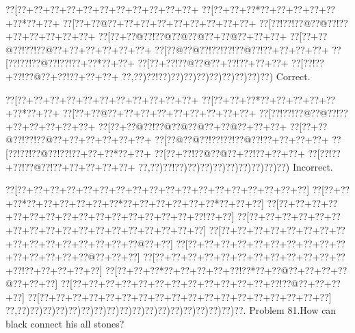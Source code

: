 \documentclass[a5paper]{article}
\begin{document}
\begin{center}
{\goo
\0??[\0??+\0??+\0??+\0??+\0??+\0??+\0??+\0??+\0??+\0??+\0??+
\0??[\0??+\0??+\0??*\0??+\0??+\0??+\0??+\0??+\0??*\0??+\0??+
\0??[\0??+\0??@\0??+\0??+\0??+\0??+\0??+\0??+\0??+\0??+\0??+
\0??[\0??!\0??!\0??@\0??@\0??!\0??+\0??+\0??+\0??+\0??+\0??+
\0??[\0??+\0??@\0??!\0??@\0??@\0??@\0??+\0??@\0??+\0??+\0??+
\0??[\0??+\0??@\0??!\0??!\0??@\0??+\0??+\0??+\0??+\0??+\0??+
\0??[\0??@\0??@\0??!\0??!\0??!\0??@\0??!\0??+\0??+\0??+\0??+
\0??[\0??!\0??!\0??@\0??!\0??!\0??+\0??*\0??+\0??+
\0??[\0??+\0??!\0??@\0??@\0??+\0??!\0??+\0??+\0??+
\0??[\0??!\0??+\0??!\0??@\0??+\0??!\0??+\0??+\0??+
\0??,\0??)\0??!\0??)\0??)\0??)\0??)\0??)\0??)\0??)\0??)\0??)
}
Correct. 

\end{center}
\begin{center}
{\goo
\0??[\0??+\0??+\0??+\0??+\0??+\0??+\0??+\0??+\0??+\0??+\0??+
\0??[\0??+\0??+\0??*\0??+\0??+\0??+\0??+\0??+\0??*\0??+\0??+
\0??[\0??+\0??@\0??+\0??+\0??+\0??+\0??+\0??+\0??+\0??+\0??+
\0??[\0??!\0??!\0??@\0??@\0??!\0??+\0??+\0??+\0??+\0??+\0??+
\0??[\0??+\0??@\0??!\0??@\0??@\0??@\0??+\0??@\0??+\0??+\0??+
\0??[\0??+\0??@\0??!\0??!\0??@\0??+\0??+\0??+\0??+\0??+\0??+
\0??[\0??@\0??@\0??!\0??!\0??!\0??@\0??!\0??+\0??+\0??+\0??+
\0??[\0??!\0??!\0??@\0??!\0??!\0??+\0??+\0??*\0??+\0??+
\0??[\0??+\0??!\0??@\0??@\0??+\0??!\0??+\0??+\0??+
\0??[\0??!\0??+\0??!\0??@\0??!\0??+\0??+\0??+\0??+\0??+
\0??,\0??)\0??!\0??)\0??)\0??)\0??)\0??)\0??)\0??)\0??)\0??)
}
Incorrect. 

\end{center}
\newpage
\begin{center}
{\goo
\0??[\0??+\0??+\0??+\0??+\0??+\0??+\0??+\0??+\0??+\0??+\0??+\0??+\0??+\0??+\0??+\0??+\0??+\0??]
\0??[\0??+\0??+\0??*\0??+\0??+\0??+\0??+\0??+\0??*\0??+\0??+\0??+\0??+\0??+\0??*\0??+\0??+\0??]
\0??[\0??+\0??+\0??+\0??+\0??+\0??+\0??+\0??+\0??+\0??+\0??+\0??+\0??+\0??+\0??+\0??!\0??+\0??]
\0??[\0??+\0??+\0??+\0??+\0??+\0??+\0??+\0??+\0??+\0??+\0??+\0??+\0??+\0??+\0??+\0??+\0??+\0??]
\0??[\0??+\0??+\0??+\0??+\0??+\0??+\0??+\0??+\0??+\0??+\0??+\0??+\0??+\0??+\0??+\0??@\0??+\0??]
\0??[\0??+\0??+\0??+\0??+\0??+\0??+\0??+\0??+\0??+\0??+\0??+\0??+\0??+\0??+\0??@\0??+\0??+\0??]
\0??[\0??+\0??+\0??+\0??+\0??+\0??+\0??+\0??+\0??+\0??+\0??+\0??+\0??!\0??+\0??+\0??+\0??+\0??]
\0??[\0??+\0??+\0??*\0??+\0??+\0??+\0??+\0??!\0??*\0??+\0??@\0??+\0??+\0??+\0??@\0??+\0??+\0??]
\0??[\0??+\0??+\0??+\0??+\0??+\0??+\0??+\0??+\0??+\0??+\0??+\0??+\0??!\0??@\0??+\0??+\0??+\0??]
\0??[\0??+\0??+\0??+\0??+\0??+\0??+\0??+\0??+\0??+\0??+\0??+\0??+\0??+\0??+\0??+\0??+\0??+\0??]
\0??,\0??)\0??)\0??)\0??)\0??)\0??)\0??)\0??)\0??)\0??)\0??)\0??)\0??)\0??)\0??)\0??)\0??)\0??.
}
Problem 81.How can black connect his all stones?

\end{center}
\end{document}
